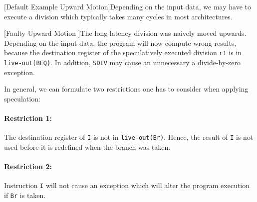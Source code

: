 \begin{center}
    \begin{minipage}{.45\textwidth}
        \centering
        \vspace{-1.7cm}
        
        \captionsetup{type=Listing}
        [Default Example Upward Motion]{Depending on the input data, we may have to execute a division which typically takes many cycles in most architectures.}
        \label{ls:ls_upward_default}
    \end{minipage}\hfill
    \begin{minipage}{.45\textwidth}
        \centering
        
        \captionsetup{type=Listing}
        [Faulty Upward Motion ]{The long-latency division was naively moved upwards. Depending on the input data, the program will now compute wrong results, because the destination register of the speculatively executed division \texttt{r1} is in \texttt{live-out(BEQ)}. In addition, \texttt{SDIV} may cause an unnecessary a divide-by-zero exception.}
        \label{ls:ls_upward_faulty}
    \end{minipage}
\end{center}

\newpage

In general, we can formulate two restrictions one has to consider when applying speculation: 
\paragraph{Restriction 1:} The destination register of \texttt{I} is not in \texttt{live-out(Br)}. Hence, the result of \texttt{I} is not used before it is redefined when the branch was taken.
\paragraph{Restriction 2:} Instruction \texttt{I} will not cause an exception which will alter the program execution if \texttt{Br} is taken. 
\\ 

